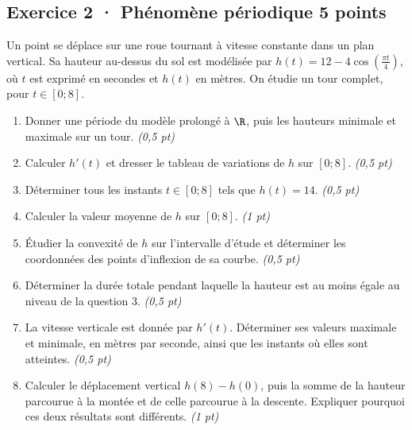 \subsection*{Exercice 2 · Phénomène périodique \hfill 5 points}Un point se déplace sur une roue tournant à vitesse constante dans un plan vertical. Sa hauteur au-dessus du sol est modélisée par $h(t)=12-4\cos\left(\frac{\pi t}{4}\right)$, où $t$ est exprimé en secondes et $h(t)$ en mètres. On étudie un tour complet, pour $t\in[0;8]$.

\begin{enumerate}

\item Donner une période du modèle prolongé à $\R$, puis les hauteurs minimale et maximale sur un tour. \hfill\textit{(0,5 pt)}

\item Calculer $h'(t)$ et dresser le tableau de variations de $h$ sur $[0;8]$. \hfill\textit{(0,5 pt)}

\item Déterminer tous les instants $t\in[0;8]$ tels que $h(t)=14$. \hfill\textit{(0,5 pt)}

\item Calculer la valeur moyenne de $h$ sur $[0;8]$. \hfill\textit{(1 pt)}

\item Étudier la convexité de $h$ sur l'intervalle d'étude et déterminer les coordonnées des points d'inflexion de sa courbe. \hfill\textit{(0,5 pt)}

\item Déterminer la durée totale pendant laquelle la hauteur est au moins égale au niveau de la question 3. \hfill\textit{(0,5 pt)}

\item La vitesse verticale est donnée par $h'(t)$. Déterminer ses valeurs maximale et minimale, en mètres par seconde, ainsi que les instants où elles sont atteintes. \hfill\textit{(0,5 pt)}

\item Calculer le déplacement vertical $h(8)-h(0)$, puis la somme de la hauteur parcourue à la montée et de celle parcourue à la descente. Expliquer pourquoi ces deux résultats sont différents. \hfill\textit{(1 pt)}

\end{enumerate}

\clearpage{}\par

